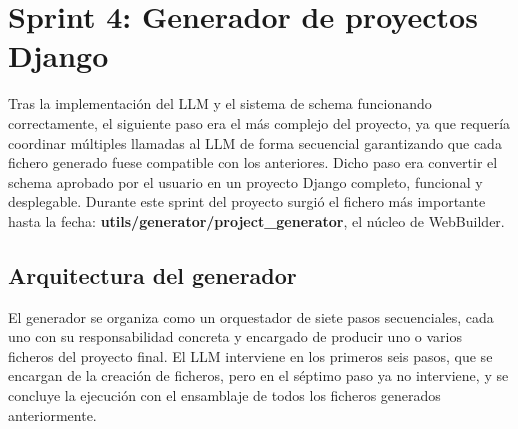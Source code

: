 \section{Sprint 4: Generador de proyectos Django}
\label{sec:generador-proytectos}

Tras la implementación del LLM y el sistema de schema funcionando correctamente, el siguiente paso era el más complejo del proyecto, ya que requería 
coordinar múltiples llamadas al LLM de forma secuencial garantizando 
que cada fichero generado fuese compatible con los anteriores. Dicho paso era convertir el schema aprobado por el usuario en un proyecto Django completo, funcional y desplegable. Durante este sprint del proyecto surgió el fichero más importante hasta la fecha: \textbf{utils/generator/project\_generator}, el núcleo de WebBuilder.


\subsection{Arquitectura del generador}
\label{subsec:arquitectura-generador}

El generador se organiza como un orquestador de siete pasos secuenciales, cada uno con su responsabilidad concreta y encargado de producir uno o varios ficheros del proyecto final.
El LLM interviene en los primeros seis pasos, que se encargan de la creación de ficheros, pero en el séptimo paso ya no interviene, y se concluye la ejecución con el ensamblaje de todos los ficheros generados anteriormente.

